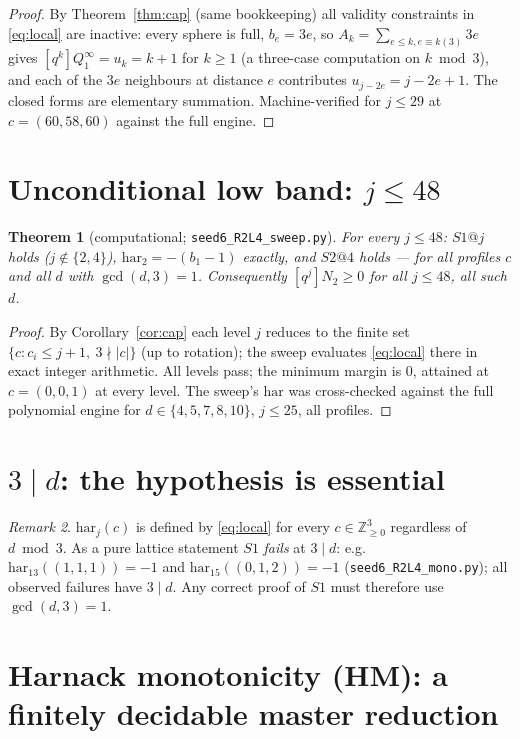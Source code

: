\documentclass[11pt]{article}
\newtheorem{theorem}{Theorem}[section]
\theoremstyle{definition}
\theoremstyle{remark}
\newtheorem{remark}[theorem]{Remark}
\newcommand{\har}{\mathrm{har}}
\newcommand{\ZZ}{\mathbb{Z}}
\begin{document}
\begin{proof}
By Theorem~\ref{thm:cap} (same bookkeeping) all validity constraints in
\eqref{eq:local} are inactive: every sphere is full, $b_e=3e$, so
$A_k=\sum_{e\le k,e\equiv k(3)}3e$ gives $[q^k]Q_1^\infty=u_k=k+1$ for
$k\ge1$ (a three-case computation on $k\bmod 3$), and each of the
$3e$ neighbours at distance $e$ contributes $u_{j-2e}=j-2e+1$. The closed
forms are elementary summation. Machine-verified for $j\le29$ at
$c=(60,58,60)$ against the full engine.
\end{proof}

\section{Unconditional low band: $j\le 48$}

\begin{theorem}[computational; \texttt{seed6\_R2L4\_sweep.py}]\label{thm:sweep}
For every $j\le 48$: $S1@j$ holds ($j\notin\{2,4\}$), $\har_2=-(b_1-1)$
exactly, and $S2@4$ holds --- for all profiles $c$ and all $d$ with
$\gcd(d,3)=1$. Consequently $[q^j]N_2\ge 0$ for all $j\le 48$, all such $d$.
\end{theorem}

\begin{proof}
By Corollary~\ref{cor:cap} each level $j$ reduces to the finite set
$\{c: c_i\le j+1,\ 3\nmid|c|\}$ (up to rotation); the sweep evaluates
\eqref{eq:local} there in exact integer arithmetic. All levels pass; the
minimum margin is $0$, attained at $c=(0,0,1)$ at every level. The sweep's
$\har$ was cross-checked against the full polynomial engine for
$d\in\{4,5,7,8,10\}$, $j\le25$, all profiles.
\end{proof}

\section{$3\mid d$: the hypothesis is essential}

\begin{remark}\label{rem:3d}
$\har_j(c)$ is defined by \eqref{eq:local} for every $c\in\ZZ_{\ge0}^3$
regardless of $d\bmod 3$. As a pure lattice statement $S1$ \emph{fails} at
$3\mid d$: e.g.\ $\har_{13}((1,1,1))=-1$ and $\har_{15}((0,1,2))=-1$
(\texttt{seed6\_R2L4\_mono.py}); all observed failures have $3\mid d$.
Any correct proof of $S1$ must therefore use $\gcd(d,3)=1$.
\end{remark}

\section{Harnack monotonicity (HM): a finitely decidable master reduction}
\end{document}
